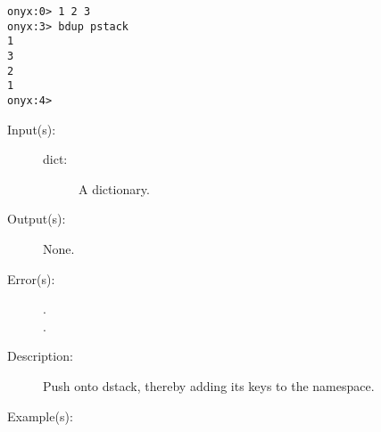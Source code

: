 \begin{description}
\begin{description}
\begin{verbatim}
onyx:0> 1 2 3
onyx:3> bdup pstack
1
3
2
1
onyx:4>
		\end{verbatim}
	\end{description}
\label{systemdict:begin}
\item[{\onyxop{dict}{begin}{--}}: ]
	\begin{description}\item[]
	\item[Input(s): ]
		\begin{description}\item[]
		\item[dict: ]
			A dictionary.
		\end{description}
	\item[Output(s): ] None.
	\item[Error(s): ]
		\begin{description}\item[]
		\item[.]
		\item[.]
		\end{description}
	\item[Description: ]
		Push  onto dstack, thereby adding its keys to the
		namespace.
	\item[Example(s): ]\begin{verbatim}


\end{verbatim}
\end{description}
\end{description}
